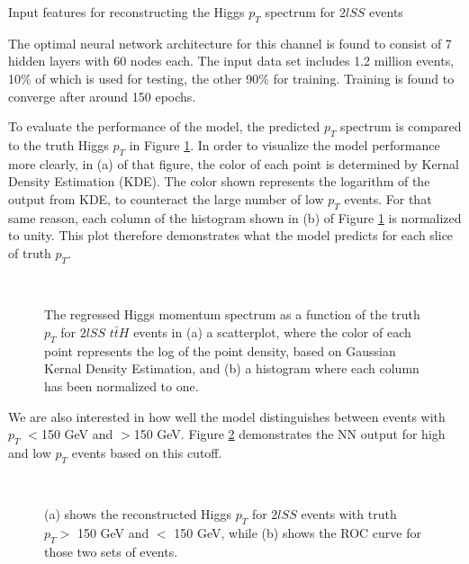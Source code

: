 \begin{table}[H]

  \caption{Input features for reconstructing the Higgs $p_T$ spectrum for $2lSS$ events}
  \label{tab:pt2lSSfeatures}
\end{table}

The optimal neural network architecture for this channel is found to consist of 7 hidden layers with 60 nodes each. The input data set includes 1.2 million events, 10\% of which is used for testing, the other 90\% for training. Training is found to converge after around 150 epochs. 

To evaluate the performance of the model, the predicted $p_T$ spectrum is compared to the truth Higgs $p_T$ in Figure \ref{fig:pt2lSSresults}. In  order to visualize the model performance more clearly, in (a) of that figure, the color of each point is determined by Kernal Density Estimation (KDE). The color shown represents the logarithm of the output from KDE, to counteract the large number of low $p_T$ events. For that same reason, each column of the histogram shown in (b) of Figure \ref{fig:pt2lSSresults} is normalized to unity. This plot therefore demonstrates what the model predicts for each slice of truth $p_T$.

\begin{figure}[H]
    \centering
    \\
    \caption{The regressed Higgs momentum spectrum as a function of the truth $p_T$ for $2lSS$ $t\bar{t}H$ events in (a) a scatterplot, where the color of each point represents the log of the point density, based on Gaussian Kernal Density Estimation, and (b) a histogram where each column  has been normalized to one.}
    \label{fig:pt2lSSresults}
\end{figure}

We are also interested in how well the model distinguishes between events with $p_T$ $<$150 GeV and $>$150 GeV. Figure \ref{fig:pt2lSSroc} demonstrates the NN output for high and low $p_T$ events based on this cutoff.

\begin{figure}[H]                                                                                                    
    \centering
    \\
    \caption{(a) shows the reconstructed Higgs $p_T$ for $2lSS$ events with truth $p_T > $ 150 GeV and $<$ 150 GeV, while (b) shows the ROC curve for those two sets of events.}
    \label{fig:pt2lSSroc}
\end{figure}
                                                                                                                            
